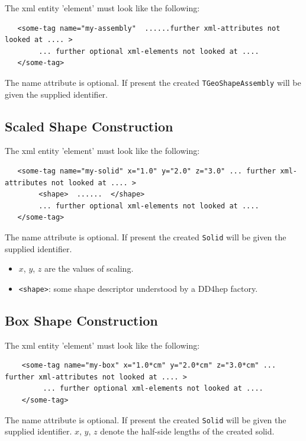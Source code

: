 The xml entity 'element' must look like the following: 
\begin{verbatim}
   <some-tag name="my-assembly"  ......further xml-attributes not looked at .... >
        ... further optional xml-elements not looked at .... 
   </some-tag>
\end{verbatim}
The name attribute is optional. If present the created \texttt{TGeoShapeAssembly} will be given the 
supplied identifier.

\subsection{Scaled Shape Construction}
\label{sec:dd4hep-manual-plugin-scaled-shape}

The xml entity 'element' must look like the following: 
\begin{verbatim}
   <some-tag name="my-solid" x="1.0" y="2.0" z="3.0" ... further xml-attributes not looked at .... >
        <shape>  ......  </shape>
        ... further optional xml-elements not looked at .... 
   </some-tag>
\end{verbatim}
The name attribute is optional. If present the created \texttt{Solid} will be given the supplied identifier.
\begin{itemize}
\item $x$, $y$, $z$ are the values of scaling.
\item \texttt{<shape>}: some shape descriptor understood by a DD4hep factory.
\end{itemize}

\subsection{Box Shape Construction}
\label{sec:dd4hep-manual-plugin-box-shape}

The xml entity 'element' must look like the following:
\begin{verbatim}
    <some-tag name="my-box" x="1.0*cm" y="2.0*cm" z="3.0*cm" ... further xml-attributes not looked at .... >
         ... further optional xml-elements not looked at .... 
    </some-tag>
\end{verbatim}
The name attribute is optional. If present the created \texttt{Solid} will be given the supplied identifier.
$x$, $y$, $z$ denote the half-side lengths of the created solid.

